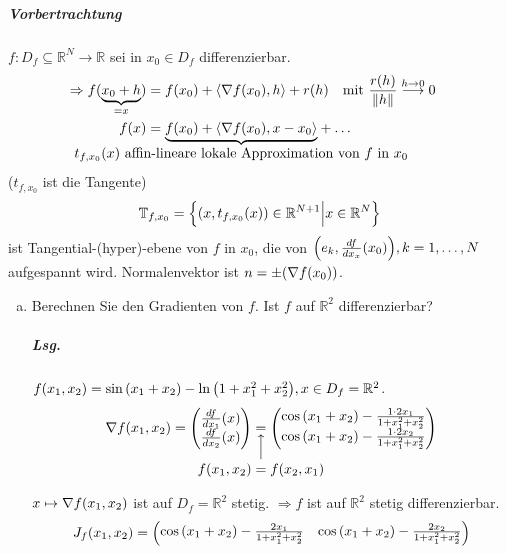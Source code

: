 \documentclass{scrreprt}
\newcommand\skalprod[1]{\left\langle #1 \right\rangle}
\begin{document}
\subparagraph{Vorbertrachtung} $f \colon D_f \subseteq \mathbb{R}^N \to \mathbb{R}$
sei in $x_0 \in D_f$ differenzierbar.
\begin{align*}
  \Rightarrow f(\underset{= x}{\underbrace{x_0 + h}})
  &= f\qty(x_0) + \skalprod{\nabla f\qty(x_0), h}
    + r(h) \quad \text{mit } \frac{r(h)}{\norm{h}} \overset{h \to 0}\longrightarrow 0 & \\
  f(x) &= \underset{\makebox[0pt]{$t_{f, x_0}(x)$ affin-lineare lokale Approximation von $f$ in $x_0$}}{
         \underbrace{f\qty(x_0) + \skalprod{\nabla f\qty(x_0), x - x_0}}
         } + \ldots
\end{align*}
($t_{f,x_0}$ ist die Tangente)
\[
  \mathbb{T}_{f, x_0} = \qty{\qty(x, t_{f, x_0}(x)) \in \mathbb{R}^{N + 1} {\Big |} x \in \mathbb{R}^N}
\]
ist Tangential-(hyper)-ebene von $f$ in $x_0$, die von
$\qty(e_k, \frac{df}{dx_x}(x_0)), k = 1, \ldots, N$ aufgespannt wird.
Normalenvektor ist $n = \pm \qty(\nabla f\qty(x_0))$.

\newpage
\begin{enumerate}[a)]
\item Berechnen Sie den Gradienten von $f$.
  Ist $f$ auf $\mathbb{R}^2$ differenzierbar?

  \subparagraph{Lsg.}
  $f\qty(x_1, x_2) = \sin\qty(x_1 + x_2) - \ln\qty(1 + x_1^2 + x_2^2), x \in D_f = \mathbb{R}^2$.
  \[
    \nabla f\qty(x_1, x_2) = \begin{pmatrix}
      \frac{df}{dx_1}(x) \\
      \frac{df}{dx_2}(x)
    \end{pmatrix}
    \underset{\makebox[0pt]{$f\qty(x_1, x_2) = f\qty(x_2, x_1)$}}{\underset{\Big \uparrow}{=}}
    \begin{pmatrix}
      \cos\qty(x_1 + x_2) - \frac{1 \cdot 2 x_1}{1 + x_1^2 + x_2^2} \\
      \cos\qty(x_1 + x_2) - \frac{1 \cdot 2 x_2}{1 + x_1^2 + x_2^2}
    \end{pmatrix}
  \]

  $x \mapsto \nabla f\qty(x_1, x_2)$ ist auf $D_f = \mathbb{R}^2$ stetig.
  $\Rightarrow f$ ist auf $\mathbb{R}^2$ stetig differenzierbar.
  \[
    J_f\qty(x_1, x_2) = \begin{pmatrix}
      \cos\qty(x_1 + x_2) - \frac{2 x_1}{1 + x_1^2 + x_2^2} &
      \cos\qty(x_1 + x_2) - \frac{2 x_2}{1 + x_1^2 + x_2^2}
    \end{pmatrix}
  \]

\end{enumerate}
\end{document}
